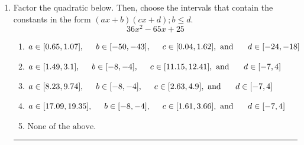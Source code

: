 \documentclass[14pt]{extbook}
\newcommand{\litem}[1]{\item#1\hspace*{-1cm}\rule{\textwidth}{0.4pt}}
\begin{document}
\begin{enumerate}
{\begin{enumerate}[label=\Alph*.]
\end{enumerate} }
\litem{
Factor the quadratic below. Then, choose the intervals that contain the constants in the form $(ax+b)(cx+d); b \leq d.$\[ 36x^{2} -65 x + 25 \]\begin{enumerate}[label=\Alph*.]
\item \( a \in [0.65, 1.07], \hspace*{5mm} b \in [-50, -43], \hspace*{5mm} c \in [0.04, 1.62], \text{ and } \hspace*{5mm} d \in [-24, -18] \)
\item \( a \in [1.49, 3.1], \hspace*{5mm} b \in [-8, -4], \hspace*{5mm} c \in [11.15, 12.41], \text{ and } \hspace*{5mm} d \in [-7, 4] \)
\item \( a \in [8.23, 9.74], \hspace*{5mm} b \in [-8, -4], \hspace*{5mm} c \in [2.63, 4.9], \text{ and } \hspace*{5mm} d \in [-7, 4] \)
\item \( a \in [17.09, 19.35], \hspace*{5mm} b \in [-8, -4], \hspace*{5mm} c \in [1.61, 3.66], \text{ and } \hspace*{5mm} d \in [-7, 4] \)
\item \( \text{None of the above.} \)


\end{enumerate}}
\end{enumerate}
\end{document}
